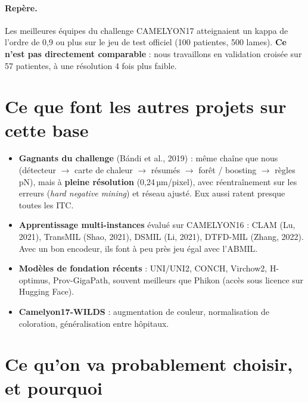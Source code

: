 \documentclass[11pt,a4paper]{article}
\begin{document}
\paragraph{Repère.} Les meilleures équipes du challenge CAMELYON17 atteignaient un kappa de l'ordre de 0,9 ou plus sur le jeu de test officiel (100 patientes, 500 lames).
\textbf{Ce n'est pas directement comparable} : nous travaillons en validation croisée sur 57 patientes, à une résolution 4 fois plus faible.

\section{Ce que font les autres projets sur cette base}
\begin{itemize}
  \item \textbf{Gagnants du challenge} (Bándi et al., 2019) : même chaîne que nous (détecteur $\to$ carte de chaleur $\to$ résumés
        $\to$ forêt / boosting $\to$ règles pN), mais à \textbf{pleine résolution} (0,24\,µm/pixel), avec réentraînement sur les erreurs
        (\emph{hard negative mining}) et réseau ajusté. Eux aussi ratent presque toutes les ITC.
  \item \textbf{Apprentissage multi-instances} évalué sur CAMELYON16 : CLAM (Lu, 2021), TransMIL (Shao, 2021), DSMIL (Li, 2021),
        DTFD-MIL (Zhang, 2022). Avec un bon encodeur, ils font à peu près jeu égal avec l'ABMIL.
  \item \textbf{Modèles de fondation récents} : UNI/UNI2, CONCH, Virchow2, H-optimus, Prov-GigaPath, souvent meilleurs que Phikon
        (accès sous licence sur Hugging Face).
  \item \textbf{Camelyon17-WILDS} : augmentation de couleur, normalisation de coloration, généralisation entre hôpitaux.
\end{itemize}

\section{Ce qu'on va probablement choisir, et pourquoi}
\end{document}
